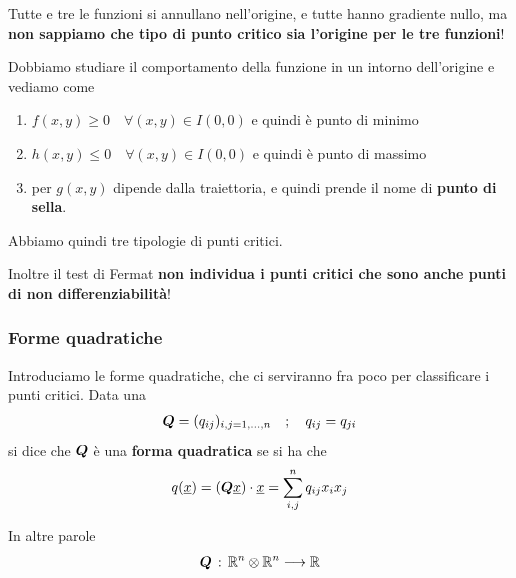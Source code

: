 Tutte e tre le funzioni si annullano nell'origine, e tutte hanno gradiente nullo, ma \textbf{non sappiamo che tipo di punto critico sia l'origine per le tre funzioni}!

Dobbiamo studiare il comportamento della funzione in un intorno dell'origine e vediamo come
\begin{enumerate}
	\item  $f(x,y)\geq 0 \quad \forall (x,y)\in I(0,0)$ e quindi è punto di minimo
	\item $h(x,y)\leq 0 \quad \forall (x,y)\in I(0,0)$ e quindi è punto di massimo
	\item per $g(x,y)$ dipende dalla traiettoria, e quindi prende il nome di \textbf{punto di sella}.
\end{enumerate}

Abbiamo quindi tre tipologie di punti critici. 

Inoltre il test di Fermat \textbf{non individua i punti critici che sono anche punti di non differenziabilità}!

\subsubsection{Forme quadratiche}

Introduciamo le forme quadratiche, che ci serviranno fra poco per classificare i punti critici.
Data una
\begin{align}
	\boldsymbol{Q} =(q_{ij})_{i,j=1,\dots,n} \quad ; \quad q_{ij}=q_{ji}
\end{align}
si dice che $\boldsymbol{Q}$ è una \textbf{forma quadratica} se si ha che
\begin{align}
	q(\underline{x})=(\boldsymbol{Q} \underline{x}) \cdot \underline{x} = \sum_{i,j}^{n} q_{ij}x_i x_j
\end{align}

In altre parole
\begin{align}
	\boldsymbol{Q} \, : \, \mathbb{R}^n \otimes \mathbb{R}^n \longrightarrow \mathbb{R}
\end{align}

